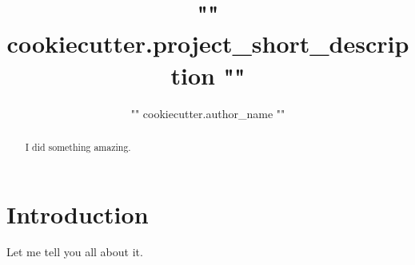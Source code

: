 \documentclass[twocolumn]{aastex631}
\begin{document}
\title{{ "{" }}{{ cookiecutter.project_short_description }}{{ "}" }}

\author{{ "{" }}{{ cookiecutter.author_name }}{{ "}" }}

\begin{abstract}
    I did something amazing.
\end{abstract}

\section{Introduction}
Let me tell you all about it.
\end{document}
